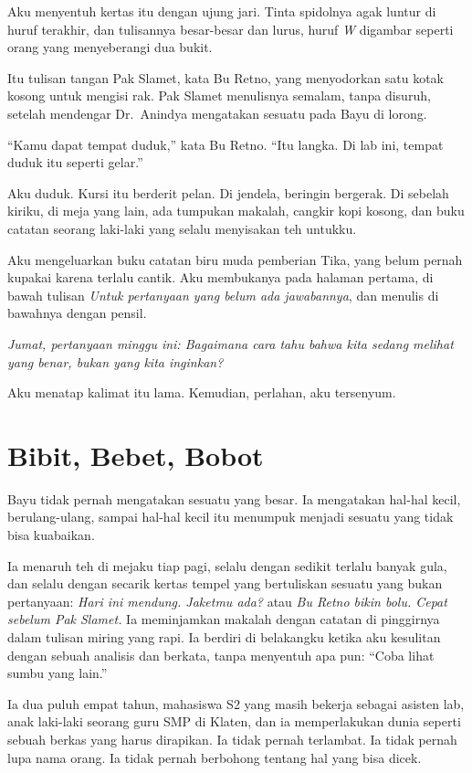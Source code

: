 \documentclass[11pt,twoside,openany]{book}
\begin{document}
Aku menyentuh kertas itu dengan ujung jari. Tinta spidolnya agak luntur di huruf terakhir, dan tulisannya besar-besar dan lurus, huruf \emph{W} digambar seperti orang yang menyeberangi dua bukit.

Itu tulisan tangan Pak Slamet, kata Bu Retno, yang menyodorkan satu kotak kosong untuk mengisi rak. Pak Slamet menulisnya semalam, tanpa disuruh, setelah mendengar Dr.~Anindya mengatakan sesuatu pada Bayu di lorong.

``Kamu dapat tempat duduk,'' kata Bu Retno. ``Itu langka. Di lab ini, tempat duduk itu seperti gelar.''

Aku duduk. Kursi itu berderit pelan. Di jendela, beringin bergerak. Di sebelah kiriku, di meja yang lain, ada tumpukan makalah, cangkir kopi kosong, dan buku catatan seorang laki-laki yang selalu menyisakan teh untukku.

Aku mengeluarkan buku catatan biru muda pemberian Tika, yang belum pernah kupakai karena terlalu cantik. Aku membukanya pada halaman pertama, di bawah tulisan \emph{Untuk pertanyaan yang belum ada jawabannya}, dan menulis di bawahnya dengan pensil.

\emph{Jumat, pertanyaan minggu ini: Bagaimana cara tahu bahwa kita sedang melihat yang benar, bukan yang kita inginkan?}

Aku menatap kalimat itu lama. Kemudian, perlahan, aku tersenyum.

\chapter{Bibit, Bebet, Bobot}
Bayu tidak pernah mengatakan sesuatu yang besar. Ia mengatakan hal-hal kecil, berulang-ulang, sampai hal-hal kecil itu menumpuk menjadi sesuatu yang tidak bisa kuabaikan.

Ia menaruh teh di mejaku tiap pagi, selalu dengan sedikit terlalu banyak gula, dan selalu dengan secarik kertas tempel yang bertuliskan sesuatu yang bukan pertanyaan: \emph{Hari ini mendung. Jaketmu ada?} atau \emph{Bu Retno bikin bolu. Cepat sebelum Pak Slamet.} Ia meminjamkan makalah dengan catatan di pinggirnya dalam tulisan miring yang rapi. Ia berdiri di belakangku ketika aku kesulitan dengan sebuah analisis dan berkata, tanpa menyentuh apa pun: ``Coba lihat sumbu yang lain.''

Ia dua puluh empat tahun, mahasiswa S2 yang masih bekerja sebagai asisten lab, anak laki-laki seorang guru SMP di Klaten, dan ia memperlakukan dunia seperti sebuah berkas yang harus dirapikan. Ia tidak pernah terlambat. Ia tidak pernah lupa nama orang. Ia tidak pernah berbohong tentang hal yang bisa dicek.
\end{document}
